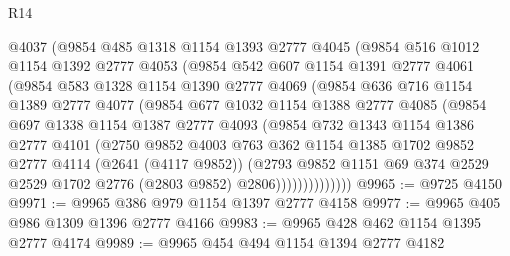\begin{lexlean}{R14}
\begin{coremodule}
            @4037
            (@9854
              @485
              @1318
              @1154
              @1393
              @2777
              @4045
              (@9854
                @516
                @1012
                @1154
                @1392
                @2777
                @4053
                (@9854
                  @542
                  @607
                  @1154
                  @1391
                  @2777
                  @4061
                  (@9854
                    @583
                    @1328
                    @1154
                    @1390
                    @2777
                    @4069
                    (@9854
                      @636
                      @716
                      @1154
                      @1389
                      @2777
                      @4077
                      (@9854
                        @677
                        @1032
                        @1154
                        @1388
                        @2777
                        @4085
                        (@9854
                          @697
                          @1338
                          @1154
                          @1387
                          @2777
                          @4093
                          (@9854
                            @732
                            @1343
                            @1154
                            @1386
                            @2777
                            @4101
                            (@2750
                              @9852
                              @4003
                              @763
                              @362
                              @1154
                              @1385
                              @1702
                              @9852
                              @2777
                              @4114
                              (@2641 (@4117 @9852))
                              (@2793
                                @9852
                                @1151
                                @69
                                @374
                                @2529
                                @2529
                                @1702
                                @2776
                                (@2803 @9852)
                                @2806))))))))))))))
@9965 := @9725 @4150
@9971 := @9965 @386 @979 @1154 @1397 @2777 @4158
@9977 := @9965 @405 @986 @1309 @1396 @2777 @4166
@9983 := @9965 @428 @462 @1154 @1395 @2777 @4174
@9989 := @9965 @454 @494 @1154 @1394 @2777 @4182

\end{coremodule}
\end{lexlean}
